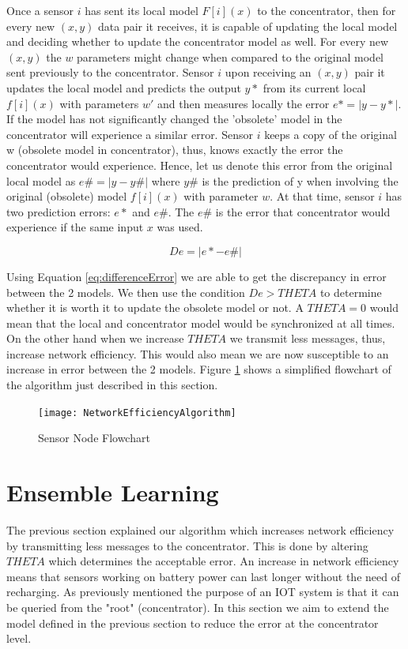 \documentclass{mproj}
\begin{document}
Once a sensor $i$ has sent its local model $F[i](x)$ to the concentrator, then for every new $(x,y)$ data pair it receives, it is capable of updating the local model and deciding whether to update the concentrator model as well. For every new $(x,y)$ the $w$ parameters might change when compared to the original model sent previously to the concentrator. Sensor $i$ upon receiving an $(x,y)$ pair it updates the local model and predicts the output $y*$ from its current local $f[i](x)$ with parameters $w'$ and then measures locally the error $e* = |y-y*|$. If the model has not significantly changed the 'obsolete' model in the concentrator will experience a similar error. Sensor $i$ keeps a copy of the original w (obsolete model in concentrator), thus, knows exactly the error the concentrator would experience. Hence, let us denote this error from the original local model as $e\# = |y - y\#|$ where $y\#$ is the prediction of y when involving the original (obsolete) model $f[i](x)$ with parameter $w$. At that time, sensor $i$ has two prediction errors: $e*$ and $e\#$. The $e\#$ is the error that concentrator would experience if the same input $x$ was used.

\begin{equation}
\label{eq:differenceError}
De = |e* - e\#|
\end{equation}

Using Equation \ref{eq:differenceError} we are able to get the discrepancy in error between the 2 models. We then use the condition $De > THETA$ to determine whether it is worth it to update the obsolete model or not. A $THETA=0$ would mean that the local and concentrator model would be synchronized at all times. On the other hand when we increase $THETA$ we transmit less messages, thus, increase network efficiency. This would also mean we are now susceptible to an increase in error between the 2 models. Figure \ref{fig:nea} shows a simplified flowchart of the algorithm just described in this section.


\begin{figure}[H]
\caption{Sensor Node Flowchart}
\label{fig:nea}
\centerline{\texttt{[image: NetworkEfficiencyAlgorithm]}}
\end{figure}

\section{Ensemble Learning}
\label{sec:ensembleLearning}
The previous section explained our algorithm which increases network efficiency by transmitting less messages to the concentrator. This is done by altering $THETA$ which determines the acceptable error. An increase in network efficiency means that sensors working on battery power can last longer without the need of recharging. As previously mentioned the purpose of an IOT system is that it can be queried from the "root" (concentrator). In this section we aim to extend the model defined in the previous section to reduce the error at the concentrator level.
\end{document}
